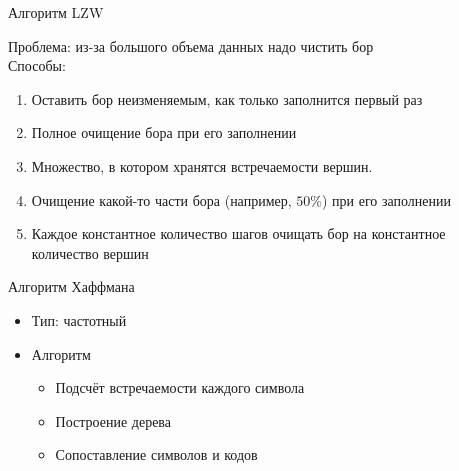 \documentclass[12pt]{beamer}
\begin{document}
\begin{frame}{Алгоритм LZW}

    Проблема: из-за большого объема данных надо чистить бор \\

    Способы:

    \begin{enumerate}

        \item <2-> Оставить бор неизменяемым, как только заполнится первый раз

        \item <3-> Полное очищение бора при его заполнении

        \item <4-> Множество, в котором хранятся встречаемости вершин.
        
        \item <5-> Очищение какой-то части бора (например, $50\%$) при его
        заполнении

        \item <6-> Каждое константное количество шагов очищать бор на 
        константное количество вершин

    \end{enumerate}
    
\end{frame}


\begin{frame}{Алгоритм Хаффмана}

    \begin{itemize}

        \item <1->Тип: частотный
        
        \item <2->Алгоритм
        
        \begin{itemize}

            \item <3-> Подсчёт встречаемости каждого символа

            \item <4-> Построение дерева

            \item <5-> Сопоставление символов и кодов

        \end{itemize}

    \end{itemize}

\end{frame}
\end{document}

